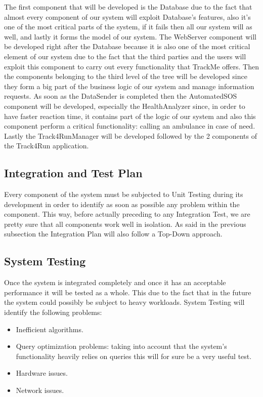 \noindent
The first component that will be developed is the Database due to the fact that almost every component of our system will exploit Database's features, also it's one of the most critical parts of the system, if it fails then all our system will as well, and lastly it forms the model of our system.
\medbreak
\noindent
The WebServer component will be developed right after the Database because it is also one of the most critical element of our system due to the fact that the third parties and the users will exploit this component to carry out every functionality that TrackMe offers.
\medbreak
\noindent
Then the components belonging to the third level of the tree will be developed since they form a big part of the business logic of our system and manage information requests.
\medbreak
\noindent
As soon as the DataSender is completed then the AutomatedSOS component will be developed, especially the HealthAnalyzer since, in order to have faster reaction time, it contains part of the logic of our system and also this component perform a critical functionality: calling an ambulance in case of need.
\medbreak
\noindent
Lastly the Track4RunManager will be developed followed by the 2 components of the Track4Run application.

\subsection{Integration and Test Plan}
Every component of the system must be subjected to Unit Testing during its development in order to identify as soon as possible any problem within the component. This way, before actually preceding to any Integration Test, we are pretty sure that all components work well in isolation.
\medbreak
\noindent
As said in the previous subsection the Integration Plan will also follow a Top-Down approach.

\subsection{System Testing}
Once the system is integrated completely and once it has an acceptable performance it will be tested as a whole. This due to the fact that in the future the system could possibly be subject to heavy workloads. System Testing will identify the following problems:

\begin{itemize}
\item Inefficient algorithms.
\item Query optimization problems: taking into account that the system's functionality heavily relies on queries this will for sure be a very useful test.
\item Hardware issues.
\item Network issues.
\end{itemize}


